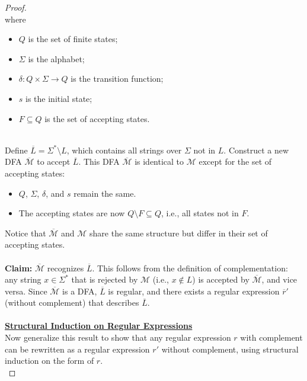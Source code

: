 \documentclass[12pt]{article}
\begin{document}
\begin{proof}
\[        \]
        where
        \begin{itemize}
            \item \( Q \) is the set of finite states;
            \item \( \Sigma \) is the alphabet;
            \item \( \delta : Q \times \Sigma \to Q \) is the transition function;
            \item \( s \) is the initial state;
            \item \( F \subseteq Q \) is the set of accepting states.
        \end{itemize}
        \leavevmode\\
        Define \( \overline{L} = \Sigma^* \setminus L \), which contains all strings over \( \Sigma \) not in \( L \). Construct a new DFA \( \overline{\mathcal{M}} \) to accept \( \overline{L} \). This DFA \( \overline{\mathcal{M}} \) is identical to \( \mathcal{M} \) except for the set of accepting states:
        \begin{itemize}
            \item \( Q \), \( \Sigma \), \( \delta \), and \( s \) remain the same.
            \item The accepting states are now \( Q \setminus F \subseteq Q \), i.e., all states not in \( F \).
        \end{itemize}
        Notice that \( \overline{\mathcal{M}} \) and \( \mathcal{M} \) share the same structure but differ in their set of accepting states. \\
        \\
        \textbf{Claim:} \( \overline{\mathcal{M}} \) recognizes \( \overline{L} \). This follows from the definition of complementation: any string \( x \in \Sigma^* \) that is rejected by \( \mathcal{M} \) (i.e., \( x \notin L \)) is accepted by \( \overline{\mathcal{M}} \), and vice versa. Since \( \overline{\mathcal{M}} \) is a DFA, \( \overline{L} \) is regular, and there exists a regular expression \( \overline{r}' \) (without complement) that describes \( \overline{L} \). \\
        \\
        \underline{\textbf{Structural Induction on Regular Expressions}} \\
        Now generalize this result to show that any regular expression \( r \) with complement can be rewritten as a regular expression \( r' \) without complement, using structural induction on the form of \( r \). \\

\end{proof}
\end{document}
